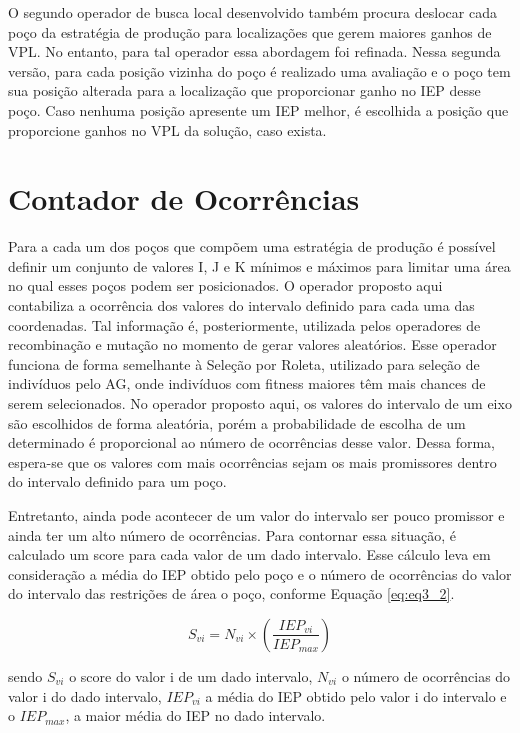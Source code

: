 O segundo operador de busca local desenvolvido também procura deslocar cada poço da estratégia de produção para localizações que gerem maiores ganhos de VPL. No entanto, para tal operador essa abordagem foi refinada. Nessa segunda versão, para cada posição vizinha do poço é realizado uma avaliação e o poço tem sua posição alterada para a localização que proporcionar ganho no IEP desse poço. Caso nenhuma posição apresente um IEP melhor, é escolhida a posição que proporcione ganhos no VPL da solução, caso exista. 

\section{Contador de Ocorrências}
  
Para a cada um dos poços que compõem uma estratégia de produção é possível definir um conjunto de valores I, J e K mínimos e máximos para limitar uma área no qual esses poços podem ser posicionados. O operador proposto aqui contabiliza a ocorrência dos valores do intervalo definido para cada uma das coordenadas. Tal informação é, posteriormente, utilizada pelos operadores de recombinação e mutação no momento de gerar valores aleatórios. Esse operador funciona de forma semelhante à Seleção por Roleta, utilizado para seleção de indivíduos pelo AG, onde indivíduos com fitness maiores têm mais chances de serem selecionados. No operador proposto aqui, os valores do intervalo de um eixo são escolhidos de forma aleatória, porém a probabilidade de escolha de um determinado é proporcional ao número de ocorrências desse valor. Dessa forma, espera-se que os valores com mais ocorrências sejam os mais promissores dentro do intervalo definido para um poço.

Entretanto, ainda pode acontecer de um valor do intervalo ser pouco promissor e ainda ter um alto número de ocorrências. Para contornar essa situação, é calculado um score para cada valor de um dado intervalo. Esse cálculo leva em consideração a média do IEP obtido pelo poço e o número de ocorrências do valor do intervalo das restrições de área o poço, conforme Equação \ref{eq:eq3_2}.

\begin{equation}
  \label{eq:eq3_2}
  S_{vi} = N_{vi} \times (\frac{IEP_{vi}}{IEP_{max}})
\end{equation}
  
sendo $S_{vi}$ o score do valor i de um dado intervalo, $N_{vi}$ o número de ocorrências do valor i do dado intervalo, $IEP_{vi}$ a média do IEP obtido pelo valor i do intervalo e o $IEP_{max}$, a maior média do IEP no dado intervalo. 

